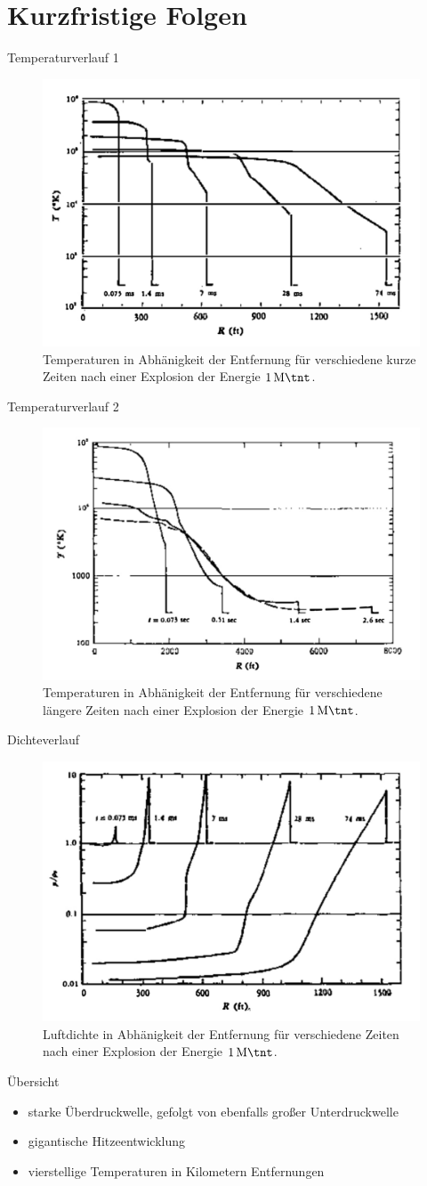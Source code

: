 \section{Kurzfristige Folgen}
\begin{frame}{Temperaturverlauf 1}
\begin{figure}
	\centering
	\includegraphics[width=0.5\linewidth]{img/img1}
	\caption{Temperaturen in Abhänigkeit der Entfernung für verschiedene kurze Zeiten nach einer Explosion der Energie $\SI{1}{\mega \tnt}$.\cite{AnnuRev18_1}}
\end{figure}
\end{frame}
\begin{frame}{Temperaturverlauf 2}
	\begin{figure}
		\centering
		\includegraphics[width=0.5\linewidth]{img/img3.jpg}
		\caption{Temperaturen in Abhänigkeit der Entfernung für verschiedene längere Zeiten nach einer Explosion der Energie $\SI{1}{\mega \tnt}$.\cite{AnnuRev18_1}}
	\end{figure}
\end{frame}
\begin{frame}{Dichteverlauf}
	\begin{figure}
		\centering
		\includegraphics[width=0.5\linewidth]{img/img2.jpg}
		\caption{Luftdichte in Abhänigkeit der Entfernung für verschiedene Zeiten nach einer Explosion der Energie $\SI{1}{\mega \tnt}$.\cite{AnnuRev18_1}}
	\end{figure}
\end{frame}
\begin{frame}{Übersicht}
	\begin{itemize}
		\item starke Überdruckwelle, gefolgt von ebenfalls großer Unterdruckwelle
		\item gigantische Hitzeentwicklung
		\item vierstellige Temperaturen in Kilometern Entfernungen
	\end{itemize}
\end{frame}
